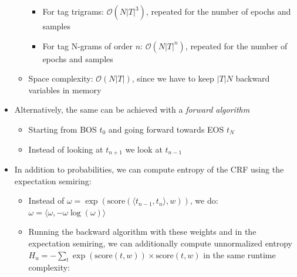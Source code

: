 \begin{itemize}
\begin{itemize}
\begin{itemize}
            \item For tag trigrams: $\mathcal{O}(N |T|^3)$, repeated for the number of epochs and samples
            \item For tag N-grams of order $n$: $\mathcal{O}(N |T|^{n})$, repeated for the number of epochs and samples
        \end{itemize}
        \item Space complexity: $\mathcal{O}(N|T|)$, since we have to keep $|T| N$ backward variables in memory
    \end{itemize}
    \item Alternatively, the same can be achieved with a \emph{forward algorithm}
    \begin{itemize}
        \item Starting from BOS $t_0$ and going forward towards EOS $t_N$
        \item Instead of looking at $t_{n+1}$ we look at $t_{n-1}$
    \end{itemize}
    \item In addition to probabilities, we can compute entropy of the CRF using the expectation semiring:
    \begin{itemize}
        \item Instead of $\omega = \exp(\textrm{score}(\langle t_{n-1}, t_n \rangle, w))$, we do:
        $
        \omega = \langle \omega, -\omega \log(\omega) \rangle
        $
        \item Running the backward algorithm with these weights and in the expectation semiring, we can additionally compute unnormalized entropy $H_u = - \sum_t \exp(\textrm{score}(t, w)) \times \textrm{score}(t, w)$ in the same runtime complexity:
\end{itemize}
\end{itemize}
